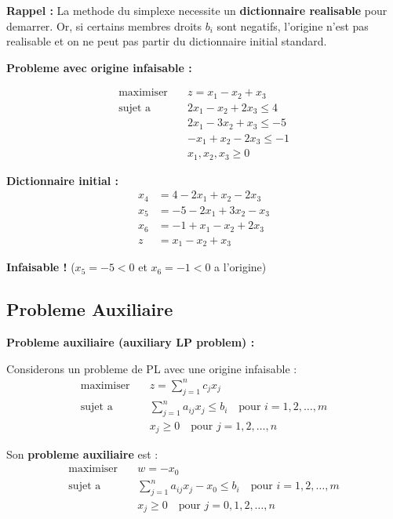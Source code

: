\documentclass[12pt,a4paper]{article}
\begin{document}
\begin{notecours}
\textbf{Rappel :} La methode du simplexe necessite un \textcolor{defvert}{\textbf{dictionnaire realisable}} pour demarrer. Or, si certains membres droits $b_i$ sont negatifs, l'origine n'est pas realisable et on ne peut pas partir du dictionnaire initial standard.
\end{notecours}

\begin{exemple}
\textbf{Probleme avec origine infaisable :}

\begin{align*}
\text{maximiser} \quad & z = x_1 - x_2 + x_3\\
\text{sujet a} \quad & 2x_1 - x_2 + 2x_3 \leq 4\\
& 2x_1 - 3x_2 + x_3 \leq -5\\
& -x_1 + x_2 - 2x_3 \leq -1\\
& x_1, x_2, x_3 \geq 0
\end{align*}

\textbf{Dictionnaire initial :}
\begin{align*}
x_4 &= 4 - 2x_1 + x_2 - 2x_3\\
x_5 &= -5 - 2x_1 + 3x_2 - x_3\\
x_6 &= -1 + x_1 - x_2 + 2x_3\\
z &= x_1 - x_2 + x_3
\end{align*}

\textcolor{importantrouge}{\textbf{Infaisable !}} ($x_5 = -5 < 0$ et $x_6 = -1 < 0$ a l'origine)
\end{exemple}

\newpage
\subsection{Probleme Auxiliaire}

\begin{definition}
\textbf{Probleme auxiliaire (auxiliary LP problem) :}

Considerons un probleme de PL avec une origine infaisable :
\begin{align*}
\text{maximiser} \quad & z = \sum_{j=1}^{n} c_jx_j\\
\text{sujet a} \quad & \sum_{j=1}^{n} a_{ij}x_j \leq b_i \quad \text{pour } i = 1, 2, \ldots, m\\
& x_j \geq 0 \quad \text{pour } j = 1, 2, \ldots, n
\end{align*}

Son \textcolor{defvert}{\textbf{probleme auxiliaire}} est :
\begin{align*}
\text{maximiser} \quad & w = -x_0\\
\text{sujet a} \quad & \sum_{j=1}^{n} a_{ij}x_j - x_0 \leq b_i \quad \text{pour } i = 1, 2, \ldots, m\\
& x_j \geq 0 \quad \text{pour } j = 0, 1, 2, \ldots, n
\end{align*}
\end{definition}
\end{document}
